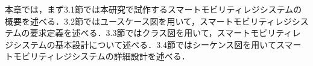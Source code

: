 

本章では，まず3.1節では本研究で試作するスマートモビリティレジシステムの概要を述べる．3.2節ではユースケース図を用いて，スマートモビリティレジシステムの要求定義を述べる．3.3節ではクラス図を用いて，スマートモビリティレジシステムの基本設計について述べる．3.4節ではシーケンス図を用いてスマートモビリティレジシステムの詳細設計を述べる．